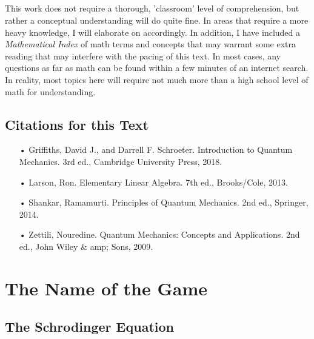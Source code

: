 \documentclass[12pt,letterpaper]{book}
\begin{document}
\paragraph*{}This work does not require a thorough, 'classroom' level of comprehension, but rather a conceptual understanding will do quite fine. In areas that require a more heavy knowledge, I will elaborate on accordingly. In addition, I have included a \textit{Mathematical Index} of math terms and concepts that may warrant some extra reading that may interfere with the pacing of this text. In most cases, any questions as far as math can be found within a few minutes of an internet search. In reality, most topics here will require not much more than a high school level of math for understanding. 

\pagebreak



\section*{Citations for this Text}
\begin{itemize}
\item[•]Griffiths, David J., and Darrell F. Schroeter. Introduction to Quantum Mechanics. 3rd ed., Cambridge University Press, 2018.
\item[•]Larson, Ron. Elementary Linear Algebra. 7th ed., Brooks/Cole, 2013.
\item[•]Shankar, Ramamurti. Principles of Quantum Mechanics. 2nd ed., Springer, 2014.
\item[•]Zettili, Nouredine. Quantum Mechanics: Concepts and Applications. 2nd ed., John Wiley \& amp; Sons, 2009.
\end{itemize}

\vspace{16cm}
\pagebreak


\chapter{The Name of the Game}


\section{The Schrodinger Equation}
\end{document}
